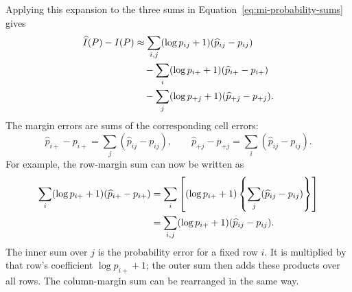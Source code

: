 Applying this expansion to the three sums in
Equation~\eqref{eq:mi-probability-sums} gives
\begin{align}
  \widehat I(P)-I(P)
  &\approx
  \sum_{i,j}(\log p_{ij}+1)(\widehat p_{ij}-p_{ij})
  \notag\\
  &\quad
  -\sum_i(\log p_{i+}+1)(\widehat p_{i+}-p_{i+})
  \notag\\
  &\quad
  -\sum_j(\log p_{+j}+1)(\widehat p_{+j}-p_{+j}).
  \label{eq:mi-first-order-three-sums}
\end{align}
The margin errors are sums of the corresponding cell errors:
\begin{equation}
  \widehat p_{i+}-p_{i+}
  =\sum_j(\widehat p_{ij}-p_{ij}),
  \qquad
  \widehat p_{+j}-p_{+j}
  =\sum_i(\widehat p_{ij}-p_{ij}).
  \label{eq:margin-errors-from-cells}
\end{equation}
For example, the row-margin sum can now be written as
\begin{align}
  \sum_i(\log p_{i+}+1)(\widehat p_{i+}-p_{i+})
  &=\sum_i\left[
    (\log p_{i+}+1)
    \left\{\sum_j(\widehat p_{ij}-p_{ij})\right\}
    \right]
  \notag\\
  &=\sum_{i,j}(\log p_{i+}+1)(\widehat p_{ij}-p_{ij}).
\end{align}
The inner sum over \(j\) is the probability error for a fixed row \(i\). It
is multiplied by that row's coefficient \(\log p_{i+}+1\); the outer sum then
adds these products over all rows. The column-margin sum can be rearranged in
the same way.

